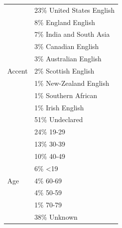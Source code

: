\begin{table}[H]
    \centering
\begin{tabular}{ !{\color{ytblborder}\vrule}l!{\color{ytblborder}\vrule}l| } 
    \hline



    \hline
     
                            &  23\% United States English \\
            &  8\% England English \\
            &  7\% India and South Asia \\
            &  3\% Canadian English \\
            &  3\% Australian English \\
    Accent  &  2\% Scottish English \\
            &  1\% New-Zealand English \\
            &  1\% Southern African \\
            &  1\% Irish English \\
            &  51\% Undeclared \\
    \hline
    
    \hline
     
                            &  24\% 19-29 \\
            &  13\% 30-39 \\
            &  10\% 40-49 \\
            &  6\% <19 \\
    Age     &  4\% 60-69 \\
            &  4\% 50-59 \\
            &  1\% 70-79 \\
            &  38\% Unknown \\
    \hline


\end{tabular}
\end{table}
